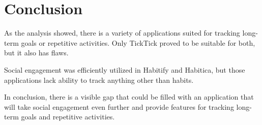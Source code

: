 
\section{Conclusion}\label{sec:conclusion}

As the analysis showed, there is a variety of applications suited for tracking long-term goals or repetitive activities.
Only TickTick proved to be suitable for both, but it also has flaws.

Social engagement was efficiently utilized in Habitify and Habitica,
but those applications lack ability to track anything other than habits.

In conclusion, there is a visible gap that could be filled with an application that will take social engagement even further and provide
features for tracking long-term goals and repetitive activities.
